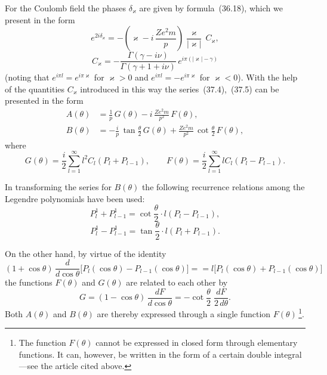 For the Coulomb field the phases $\delta_\varkappa$ are given by formula~(36.18), which we present in the form
\begin{equation}
e^{2i\delta_\varkappa} = -\left(\varkappa - i\,\frac{Ze^2m}{p}\right)\frac{\varkappa}{|\varkappa|}\,C_\varkappa,
\tag{37.6}
\end{equation}
\[
C_\varkappa = -\frac{\Gamma(\gamma - i\nu)}{\Gamma(\gamma + 1 + i\nu)}\,e^{i\pi(|\varkappa|-\gamma)}
\]
(noting that $e^{i\pi l} = e^{i\pi\varkappa}$ for $\varkappa > 0$ and $e^{i\pi l} = -e^{i\pi\varkappa}$ for $\varkappa < 0$). With the help of the quantities $C_\varkappa$ introduced in this way the series~(37.4),~(37.5) can be presented in the form
\begin{equation}
\begin{aligned}
A(\theta) &= \frac{1}{p}\,G(\theta) - i\,\frac{Ze^2m}{p^2}\,F(\theta),\\[4pt]
B(\theta) &= -\frac{i}{p}\,\tan\frac{\theta}{2}\,G(\theta) + \frac{Ze^2m}{p^2}\,\cot\frac{\theta}{2}\,F(\theta),
\end{aligned}
\tag{37.7}
\end{equation}
where
\begin{equation}
G(\theta) = \frac{i}{2}\sum_{l=1}^{\infty} l^2 C_l(P_l + P_{l-1}),\qquad F(\theta) = \frac{i}{2}\sum_{l=1}^{\infty} lC_l(P_l - P_{l-1}).
\tag{37.8}
\end{equation}

In transforming the series for $B(\theta)$ the following recurrence relations among the Legendre polynomials have been used:
\begin{equation}
P_l^1 + P_{l-1}^1 = \cot\frac{\theta}{2}\cdot l(P_l - P_{l-1}),
\tag{37.9}
\end{equation}
\begin{equation}
P_l^1 - P_{l-1}^1 = \tan\frac{\theta}{2}\cdot l(P_l + P_{l-1}).
\tag{37.10}
\end{equation}

On the other hand, by virtue of the identity
\begin{equation}
(1 + \cos\theta)\,\frac{d}{d\cos\theta}\bigl[P_l(\cos\theta) - P_{l-1}(\cos\theta)\bigr] =
= l\bigl[P_l(\cos\theta) + P_{l-1}(\cos\theta)\bigr]
\tag{37.11}
\end{equation}
the functions $F(\theta)$ and $G(\theta)$ are related to each other by
\begin{equation}
G = (1-\cos\theta)\,\frac{dF}{d\cos\theta} = -\cot\frac{\theta}{2}\;\frac{dF}{2\,d\theta}.
\tag{37.12}
\end{equation}
Both $A(\theta)$ and $B(\theta)$ are thereby expressed through a single function $F(\theta)$\,\footnote{The function $F(\theta)$ cannot be expressed in closed form through elementary functions. It can, however, be written in the form of a certain double integral---see the article cited above.}.
